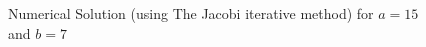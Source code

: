 \begin{figure}[h]\label{Numfig}
\begin{minipage}[h]{0.49\linewidth}
\end{minipage}
\hfill
\begin{minipage}[h]{0.49\linewidth}
\end{minipage}
\caption{Numerical Solution (using The Jacobi iterative method) for $a=15$ and $b=7$}
\label{ris:image1}
\end{figure}


